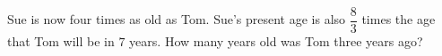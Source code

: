 Sue is now four times as old as Tom. Sue's present age is also $\dfrac83$ times the age that Tom will be in $7$ years. How many years old was Tom three years ago?
